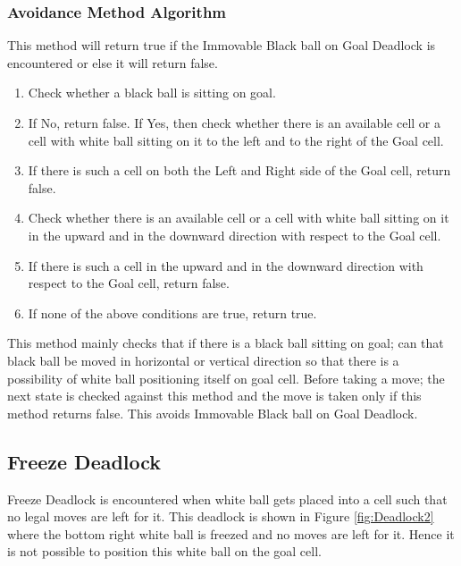 \documentclass[letterpaper]{article}
\begin{document}
\subsubsection {Avoidance Method Algorithm}
This method will return true if the Immovable Black ball on Goal Deadlock is encountered or else it will return false.
\begin{enumerate}\addtocounter{enumi}{0}
\item Check whether a black ball is sitting on goal.
\item If No, return false.
If Yes, then check whether there is an available cell or a cell with white ball sitting on it to the left and to the right of the Goal cell.
\item If there is such a cell on both the Left and Right side of the Goal cell, return false.
\item Check whether there is an available cell or a cell with white ball sitting on it in the upward and in the downward direction with respect to the Goal cell.
\item If there is such a cell in the upward and in the downward direction with respect to the Goal cell, return false.
\item If none of the above conditions are true, return true.
\end{enumerate}
  
This method mainly checks that if there is a black ball sitting on goal; can that black ball be moved in horizontal or vertical direction so that there is a possibility of white ball positioning itself on goal cell. Before taking a move; the next state is checked against this method and the move is taken only if this method returns false. This avoids Immovable Black ball on Goal Deadlock. 

\subsection{Freeze Deadlock}
Freeze Deadlock is encountered when white ball gets placed into a cell such that no legal moves are left for it. This deadlock is shown in Figure \ref{fig:Deadlock2} where the bottom right white ball is freezed and no moves are left for it. Hence it is not possible to position this white ball on the goal cell.
\end{document}
